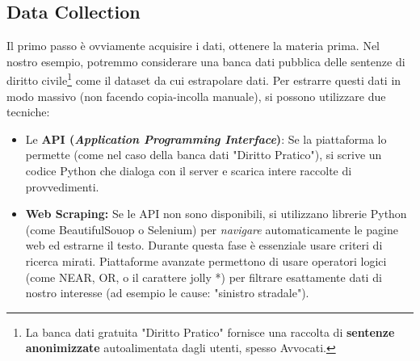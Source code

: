 \documentclass{article}
\begin{document}
\subsection{Data Collection}
Il primo passo è ovviamente acquisire i dati, ottenere la materia prima. Nel nostro esempio, potremmo considerare una banca dati pubblica delle sentenze di diritto civile\footnote{La banca dati gratuita "Diritto Pratico" fornisce una raccolta di \textbf{sentenze anonimizzate} autoalimentata dagli utenti, spesso Avvocati.} come il dataset da cui estrapolare dati. Per estrarre questi dati in modo massivo (non facendo copia-incolla manuale), si possono utilizzare due tecniche:
\\
\begin{itemize}
    \item Le \textbf{API (\textit{Application Programming Interface})}: Se la piattaforma lo permette (come nel caso della banca dati "Diritto Pratico"), si scrive un codice Python che dialoga con il server e scarica intere raccolte di provvedimenti.

    \item \textbf{Web Scraping:} Se le API non sono disponibili, si utilizzano librerie Python (come BeautifulSouop o Selenium) per \textit{navigare} automaticamente le pagine web ed estrarne il testo. Durante questa fase è essenziale usare criteri di ricerca mirati. Piattaforme avanzate permettono di usare operatori logici (come NEAR, OR, o il carattere jolly *) per filtrare esattamente dati di nostro interesse (ad esempio le cause: "sinistro stradale").
\end{itemize}
\end{document}
